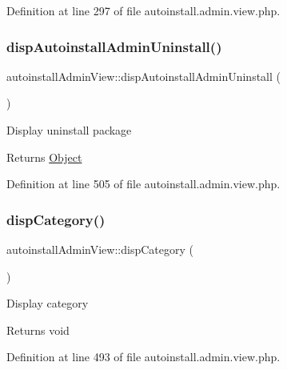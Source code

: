 Definition at line 297 of file autoinstall.\+admin.\+view.\+php.

\mbox{\label{classautoinstallAdminView_a5f7303fa7b93ab464b65e0917b8d75ca}} 
\subsubsection{\texorpdfstring{disp\+Autoinstall\+Admin\+Uninstall()}{dispAutoinstallAdminUninstall()}}
{\footnotesize\ttfamily autoinstall\+Admin\+View\+::disp\+Autoinstall\+Admin\+Uninstall (\begin{DoxyParamCaption}{ }\end{DoxyParamCaption})}

Display uninstall package

\begin{DoxyReturn}{Returns}
\hyperlink{classObject}{Object} 
\end{DoxyReturn}


Definition at line 505 of file autoinstall.\+admin.\+view.\+php.

\mbox{\label{classautoinstallAdminView_ac3b285aaf0eb96bbfb2986917ca3571b}} 
\subsubsection{\texorpdfstring{disp\+Category()}{dispCategory()}}
{\footnotesize\ttfamily autoinstall\+Admin\+View\+::disp\+Category (\begin{DoxyParamCaption}{ }\end{DoxyParamCaption})}

Display category

\begin{DoxyReturn}{Returns}
void 
\end{DoxyReturn}


Definition at line 493 of file autoinstall.\+admin.\+view.\+php.

\mbox{\label{classautoinstallAdminView_a206401d0dc48b6d0e60f1520ba972526}} 
